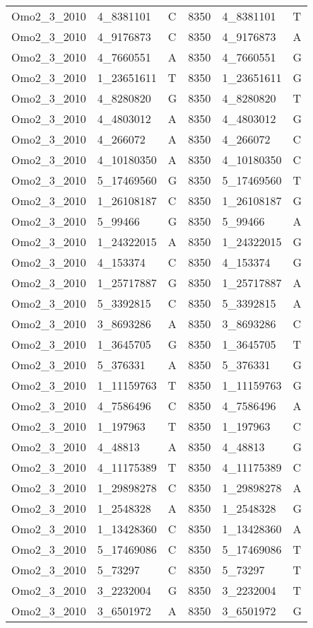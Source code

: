 \begin{center}
\begin{longtable}{|l|l|l|l|l|l|}
Omo2\_3\_2010&4\_8381101&C&8350&4\_8381101&T\\
Omo2\_3\_2010&4\_9176873&C&8350&4\_9176873&A\\
Omo2\_3\_2010&4\_7660551&A&8350&4\_7660551&G\\
Omo2\_3\_2010&1\_23651611&T&8350&1\_23651611&G\\
Omo2\_3\_2010&4\_8280820&G&8350&4\_8280820&T\\
Omo2\_3\_2010&4\_4803012&A&8350&4\_4803012&G\\
Omo2\_3\_2010&4\_266072&A&8350&4\_266072&C\\
Omo2\_3\_2010&4\_10180350&A&8350&4\_10180350&C\\
Omo2\_3\_2010&5\_17469560&G&8350&5\_17469560&T\\
Omo2\_3\_2010&1\_26108187&C&8350&1\_26108187&G\\
Omo2\_3\_2010&5\_99466&G&8350&5\_99466&A\\
Omo2\_3\_2010&1\_24322015&A&8350&1\_24322015&G\\
Omo2\_3\_2010&4\_153374&C&8350&4\_153374&G\\
Omo2\_3\_2010&1\_25717887&G&8350&1\_25717887&A\\
Omo2\_3\_2010&5\_3392815&C&8350&5\_3392815&A\\
Omo2\_3\_2010&3\_8693286&A&8350&3\_8693286&C\\
Omo2\_3\_2010&1\_3645705&G&8350&1\_3645705&T\\
Omo2\_3\_2010&5\_376331&A&8350&5\_376331&G\\
Omo2\_3\_2010&1\_11159763&T&8350&1\_11159763&G\\
Omo2\_3\_2010&4\_7586496&C&8350&4\_7586496&A\\
Omo2\_3\_2010&1\_197963&T&8350&1\_197963&C\\
Omo2\_3\_2010&4\_48813&A&8350&4\_48813&G\\
Omo2\_3\_2010&4\_11175389&T&8350&4\_11175389&C\\
Omo2\_3\_2010&1\_29898278&C&8350&1\_29898278&A\\
Omo2\_3\_2010&1\_2548328&A&8350&1\_2548328&G\\
Omo2\_3\_2010&1\_13428360&C&8350&1\_13428360&A\\
Omo2\_3\_2010&5\_17469086&C&8350&5\_17469086&T\\
Omo2\_3\_2010&5\_73297&C&8350&5\_73297&T\\
Omo2\_3\_2010&3\_2232004&G&8350&3\_2232004&T\\
Omo2\_3\_2010&3\_6501972&A&8350&3\_6501972&G\\

\end{longtable}
\end{center}
